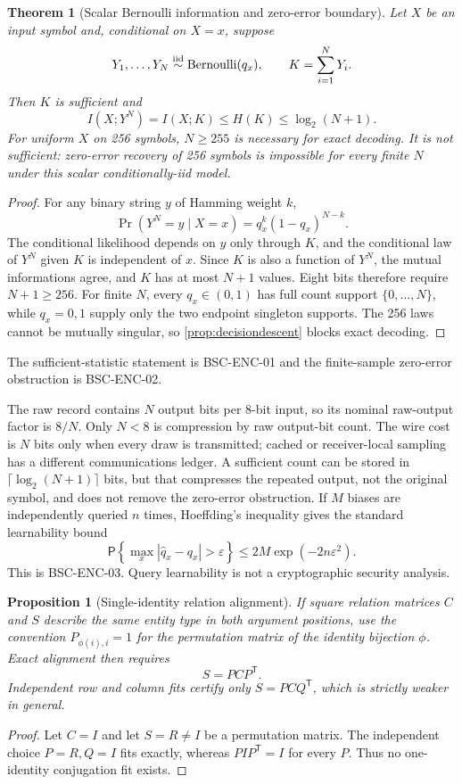 \documentclass[11pt,a4paper]{article}
\theoremstyle{definition}
\theoremstyle{plain}
\newtheorem{proposition}[definition]{Proposition}
\newtheorem{theorem}[definition]{Theorem}
\theoremstyle{remark}
\newcommand{\Prob}{\mathsf P}
\begin{document}
\begin{theorem}[Scalar Bernoulli information and zero-error boundary]
\label{thm:bernoulli-encoding}
Let \(X\) be an input symbol and, conditional on \(X=x\), suppose
\[
Y_1,\ldots,Y_N\mathrel{\overset{\rm iid}{\sim}}
\operatorname{Bernoulli}(q_x),
\qquad K=\sum_{i=1}^{N}Y_i .
\]
Then \(K\) is sufficient and
\[
I(X;Y^N)=I(X;K)\le H(K)\le\log_2(N+1).
\]
For uniform \(X\) on 256 symbols, \(N\ge255\) is necessary for exact
decoding.  It is not sufficient: zero-error recovery of 256 symbols is
impossible for every finite \(N\) under this scalar conditionally-iid model.
\end{theorem}
\begin{proof}
For any binary string \(y\) of Hamming weight \(k\),
\[
\Pr(Y^N=y\mid X=x)=q_x^k(1-q_x)^{N-k}.
\]
The conditional likelihood depends on \(y\) only through \(K\), and the
conditional law of \(Y^N\) given \(K\) is independent of \(x\).  Since \(K\)
is also a function of \(Y^N\), the mutual informations agree, and \(K\) has
at most \(N+1\) values.  Eight bits therefore require \(N+1\ge256\).
For finite \(N\), every \(q_x\in(0,1)\) has full count support
\(\{0,\ldots,N\}\), while \(q_x=0,1\) supply only the two endpoint singleton
supports.  The 256 laws cannot be mutually singular, so
\cref{prop:decisiondescent} blocks exact decoding.
\end{proof}
The sufficient-statistic statement is BSC-ENC-01 and the finite-sample
zero-error obstruction is BSC-ENC-02.

The raw record contains \(N\) output bits per 8-bit input, so its nominal
raw-output factor is \(8/N\).  Only \(N<8\) is compression by raw output-bit
count.  The wire cost is \(N\) bits only when every draw is transmitted;
cached or receiver-local sampling has a different communications ledger.  A
sufficient count can be stored in \(\lceil\log_2(N+1)\rceil\) bits, but that
compresses the repeated output, not the original symbol, and does not remove
the zero-error obstruction.  If \(M\) biases are independently queried \(n\) times,
Hoeffding's inequality gives the standard learnability bound
\[
\Prob\!\left\{\max_x|\widehat q_x-q_x|>\varepsilon\right\}
\le2M\exp(-2n\varepsilon^2).
\]
This is BSC-ENC-03.  Query learnability is not a cryptographic security
analysis.

\begin{proposition}[Single-identity relation alignment]
\label{prop:single-alignment}
If square relation matrices \(C\) and \(S\) describe the same entity type in
both argument positions, use the convention \(P_{\phi(i),i}=1\) for the
permutation matrix of the identity bijection \(\phi\).  Exact alignment then
requires
\[
S=PCP^{\mathsf T}.
\]
Independent row and column fits certify only
\(S=PCQ^{\mathsf T}\), which is strictly weaker in general.
\end{proposition}
\begin{proof}
Let \(C=I\) and let \(S=R\ne I\) be a permutation matrix.  The independent
choice \(P=R,Q=I\) fits exactly, whereas
\(PIP^{\mathsf T}=I\) for every \(P\).  Thus no one-identity conjugation fit
exists.
\end{proof}
\end{document}
